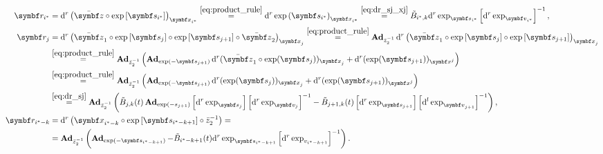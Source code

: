 \begin{equation*}
  \begin{aligned}
    \symbf r_{i^*}
     & = \mathrm{d}^r \left( \bar \z \circ \exp \left[ \symbf s_{i^*} \right] \right)_{\x_{i^*}}
    \overset{\eqref{eq:product_rule}}= \mathrm{d}^r \exp\left( \symbf s_{i^*} \right)_{\x_{i^*}} \overset{\eqref{eq:dr_sj_xj}}=  \tilde B_{i^*, k} \mathrm{d}^r \exp_{\symbf s_{i^*}} \left[ \mathrm{d}^r \exp_{\bv_{i^*}} \right]^{-1},                                                                      \\
    \symbf r_{j}
     & = \mathrm{d}^r \left( \bar \z_1 \circ \exp \left[ \symbf s_{j} \right]\circ \exp \left[ \symbf s_{j+1} \right] \circ \bar \z_2 \right)_{\x_j}
    \overset{\eqref{eq:product_rule}}= \bAd_{\bar z_2^{-1}} \mathrm{d}^r \left( \bar \z_1 \circ \exp \left[ \symbf s_{j} \right]\circ \exp \left[ \symbf s_{j+1} \right] \right)_{\x_j}                                                                                                                                                             \\
     & \overset{\eqref{eq:product_rule}}= \bAd_{\bar z_2^{-1}} \left( \bAd_{\exp(-\symbf s_{j+1})} \mathrm{d}^r (\bar \z_1 \circ \exp(\symbf s_j))_{\x_j} + \mathrm{d}^r (\exp(\symbf s_{j+1}))_{\x^j}  \right)                                                                                                                                     \\
     & \overset{\eqref{eq:product_rule}}= \bAd_{\bar z_2^{-1}} \left( \bAd_{\exp(-\symbf s_{j+1})} \mathrm{d}^r (\exp(\symbf s_j))_{\x_j} + \mathrm{d}^r (\exp(\symbf s_{j+1}))_{\x^j}  \right)                                                                                                                                                     \\
     & \overset{\eqref{eq:dr_sj}}= \bAd_{\bar z_2^{-1}} \left( \tilde B_{j, k}(t) \bAd_{\exp(-s_{j+1})} \left[ \mathrm{d}^r \exp_{\symbf s_j} \right] \left[ \mathrm{d}^r \exp_{\symbf v_j} \right]^{-1} - \tilde B_{j+1, k}(t) \left[ \mathrm{d}^r \exp_{\symbf s_{j+1}} \right] \left[ \mathrm{d}^l \exp_{\bv_{j+1}} \right]^{-1} \right), \\
     \symbf r_{i^{*} - k} & = \mathrm{d}^{r} \left( \x_{i^{*} - k} \circ \exp \left[ \symbf s_{i^{*}-k+1} \right] \circ \bar z_{2}^{-1} \right) =  \\
     & = \bAd_{\bar z_{2}^{-1}} \left( \bAd_{\exp(-\symbf s_{i^{*} - k + 1})} - \tilde B_{i^{*} - k + 1}(t) \mathrm{d}^{r} \exp_{\symbf s_{i^{*} - k + 1}} \left[ \mathrm{d}^{r} \exp_{v_{i^{*} - k + 1}} \right]^{-1} \right).
  \end{aligned}
\end{equation*}

